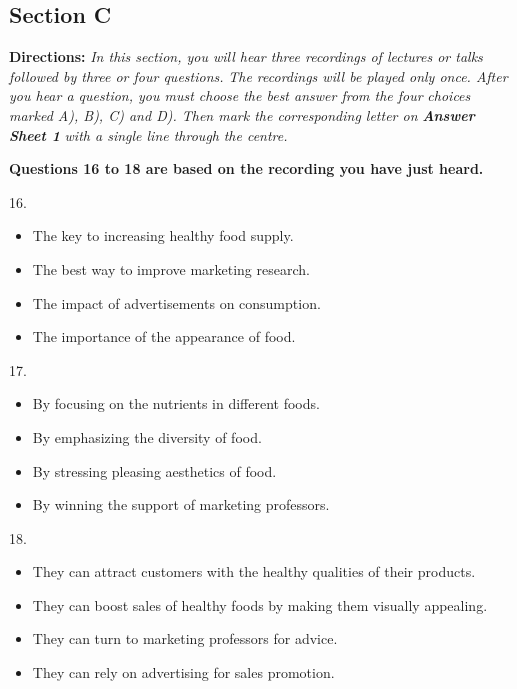 \documentclass[UTF8,11pt]{ctexart}
\begin{document}
\subsection*{\textbf{Section C}}


\textbf{Directions:}\textit{ In this section, you will hear three recordings of lectures or talks followed by three or four questions.} \textit{The recordings will be played only once. After you hear a question, you must choose the best answer from the four} \textit{choices marked A), B), C) and D). Then mark the corresponding letter on }\textbf{\textit{Answer Sheet 1}}\textit{ with a single line through} \textit{the centre.}


\textbf{Questions 16 to 18 are based on the recording you have just heard.}


16.


\begin{itemize}[leftmargin=2em,itemsep=.2em,topsep=.4em]\item[A.] The key to increasing healthy food supply.
\item[B.] The best way to improve marketing research.
\item[C.] The impact of advertisements on consumption.
\item[D.] The importance of the appearance of food.
\end{itemize}

17.


\begin{itemize}[leftmargin=2em,itemsep=.2em,topsep=.4em]\item[A.] By focusing on the nutrients in different foods.
\item[B.] By emphasizing the diversity of food.
\item[C.] By stressing pleasing aesthetics of food.
\item[D.] By winning the support of marketing professors.
\end{itemize}

18.


\begin{itemize}[leftmargin=2em,itemsep=.2em,topsep=.4em]\item[A.] They can attract customers with the healthy qualities of their products.
\item[B.] They can boost sales of healthy foods by making them visually appealing.
\item[C.] They can turn to marketing professors for advice.
\item[D.] They can rely on advertising for sales promotion.
\end{itemize}
\end{document}
